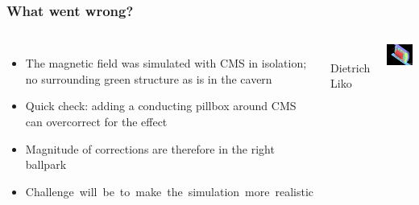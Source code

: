 \documentclass[compress]{beamer}
\begin{document}
\begin{frame}
\frametitle{What went wrong?}

\begin{columns}
\begin{itemize}\setlength{\itemsep}{0.25 cm}
\item The magnetic field was simulated with CMS in isolation; no surrounding green structure as is in the cavern
\item Quick check: adding a conducting pillbox around CMS can overcorrect for the effect
\item Magnitude of corrections are therefore in the right ballpark
\item \mbox{Challenge will be to make the simulation more realistic\hspace{-5 cm}}
\end{itemize}

\mbox{ } \hfill {\tiny Dietrich Liko}

\vspace{0.2 cm}
\includegraphics[width=\linewidth]{newsimulation.png}
\end{columns}
\end{frame}

\end{document}
